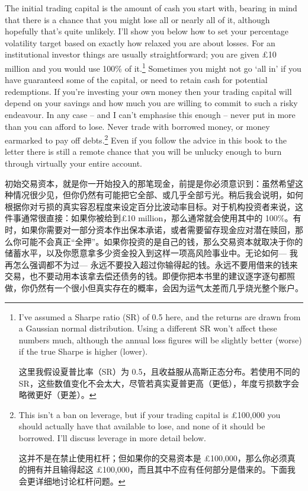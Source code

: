 \begin{englishblock} The initial trading capital is the amount of cash you start with, bearing in mind that there is a chance that you might lose all or nearly all of it, although hopefully that's quite unlikely. I'll show you below how to set your percentage volatility target based on exactly how relaxed you are about losses. For an institutional investor things are usually straightforward; you are given £10 million and you would use 100\% of it.\footnote{I've assumed a Sharpe ratio (SR) of 0.5 here, and the returns are drawn from a Gaussian normal distribution. Using a different SR won't affect these numbers much, although the annual loss figures will be slightly better (worse) if the true Sharpe is higher (lower). \par 这里我假设夏普比率（SR）为 0.5，且收益服从高斯正态分布。若使用不同的 SR，这些数值变化不会太大，尽管若真实夏普更高（更低），年度亏损数字会略微更好（更差）。} Sometimes you might not go ‘all in' if you have guaranteed some of the capital, or need to retain cash for potential redemptions. If you're investing your own money then your trading capital will depend on your savings and how much you are willing to commit to such a risky endeavour. In any case -- and I can't emphasise this enough -- never put in more than you can afford to lose. Never trade with borrowed money, or money earmarked to pay off debts.\footnote{This isn't a ban on leverage, but if your trading capital is £100,000 you should actually have that available to lose, and none of it should be borrowed. I'll discuss leverage in more detail below. \par 这并不是在禁止使用杠杆；但如果你的交易资本是 £100,000，那么你必须真的拥有并且输得起这 £100,000，而且其中不应有任何部分是借来的。下面我会更详细地讨论杠杆问题。} Even if you follow the advice in this book to the letter there is still a remote chance that you will be unlucky enough to burn through virtually your entire account. \end{englishblock}

\begin{chineseblock}初始交易资本，就是你一开始投入的那笔现金，前提是你必须意识到：虽然希望这种情况很少见，但你仍然有可能把它全部、或几乎全部亏光。稍后我会说明，如何根据你对亏损的真实容忍程度来设定百分比波动率目标。对于机构投资者来说，这件事通常很直接：如果你被给到£10 million，那么通常就会使用其中的 100\%。有时，如果你需要对一部分资本作出保本承诺，或者需要留存现金应对潜在赎回，那么你可能不会真正“全押”。如果你投资的是自己的钱，那么交易资本就取决于你的储蓄水平，以及你愿意拿多少资金投入到这样一项高风险事业中。无论如何--- 我再怎么强调都不为过--- 永远不要投入超过你输得起的钱。永远不要用借来的钱来交易，也不要动用本该拿去偿还债务的钱。即便你把本书里的建议逐字逐句都照做，你仍然有一个很小但真实存在的概率，会因为运气太差而几乎烧光整个账户。\end{chineseblock}

